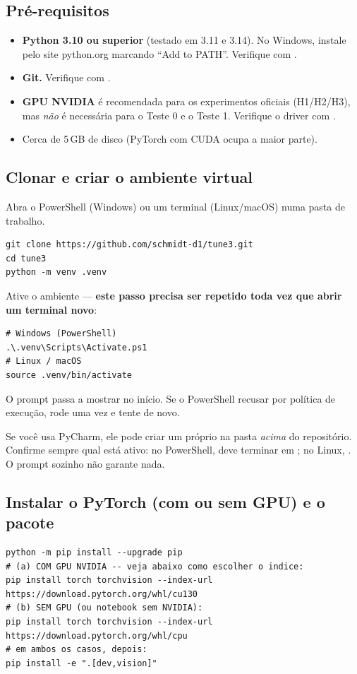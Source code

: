 \subsection{Pré-requisitos}
\begin{itemize}
\item \textbf{Python 3.10 ou superior} (testado em 3.11 e 3.14). No Windows, instale pelo site python.org marcando ``Add to PATH''. Verifique com .
\item \textbf{Git.} Verifique com .
\item \textbf{GPU NVIDIA} é recomendada para os experimentos oficiais (H1/H2/H3), mas \emph{não} é necessária para o Teste 0 e o Teste 1. Verifique o driver com .
\item Cerca de 5\,GB de disco (PyTorch com CUDA ocupa a maior parte).
\end{itemize}

\subsection{Clonar e criar o ambiente virtual}
Abra o PowerShell (Windows) ou um terminal (Linux/macOS) numa pasta de trabalho.
\begin{lstlisting}
git clone https://github.com/schmidt-d1/tune3.git
cd tune3
python -m venv .venv
\end{lstlisting}
Ative o ambiente --- \textbf{este passo precisa ser repetido toda vez que abrir um terminal novo}:
\begin{lstlisting}
# Windows (PowerShell)
.\.venv\Scripts\Activate.ps1
# Linux / macOS
source .venv/bin/activate
\end{lstlisting}
O prompt passa a mostrar  no início. Se o PowerShell recusar por política de execução, rode uma vez  e tente de novo.

\begin{alerta}
Se você usa PyCharm, ele pode criar um  próprio na pasta \emph{acima} do repositório. Confirme sempre qual está ativo: no PowerShell,  deve terminar em ; no Linux, . O prompt  sozinho não garante nada.
\end{alerta}

\subsection{Instalar o PyTorch (com ou sem GPU) e o pacote}\label{sec:instalar}
\begin{lstlisting}
python -m pip install --upgrade pip
# (a) COM GPU NVIDIA -- veja abaixo como escolher o indice:
pip install torch torchvision --index-url https://download.pytorch.org/whl/cu130
# (b) SEM GPU (ou notebook sem NVIDIA):
pip install torch torchvision --index-url https://download.pytorch.org/whl/cpu
# em ambos os casos, depois:
pip install -e ".[dev,vision]"
\end{lstlisting}

